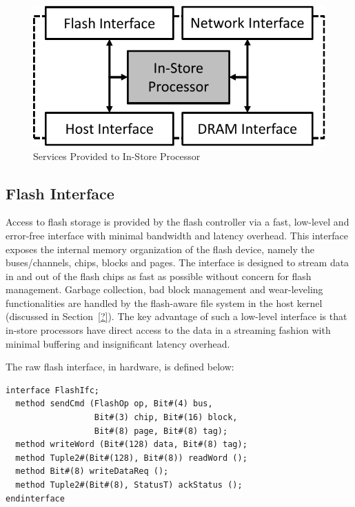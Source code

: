 \begin{figure}[h]
	\begin{center}
	\includegraphics[width=0.3\paperwidth]{figures/isp-service-crop.pdf}
	\caption{Services Provided to In-Store Processor}
	\label{fig:ispcore}
	\end{center}
\end{figure}

\subsection{Flash Interface}

Access to flash storage is provided by the flash controller via a
fast, low-level and error-free interface with minimal bandwidth and
latency overhead. This interface exposes the internal memory organization of
the flash device, namely the buses/channels, chips, blocks and pages.
The interface is designed to stream data in
and out of the flash chips as fast as possible without concern for
flash management. Garbage collection, bad block management and
wear-leveling functionalities are handled by the flash-aware file system
in the host kernel (discussed in Section~\ref{?}). The key advantage of such
a low-level interface is that in-store processors have direct access to
the data in a streaming fashion with minimal buffering and insignificant
latency overhead. 

The raw flash interface, in hardware, is defined below:

\begin{lstlisting}
interface FlashIfc;       
  method sendCmd (FlashOp op, Bit#(4) bus,
                  Bit#(3) chip, Bit#(16) block, 
                  Bit#(8) page, Bit#(8) tag);        
  method writeWord (Bit#(128) data, Bit#(8) tag);
  method Tuple2#(Bit#(128), Bit#(8)) readWord (); 
  method Bit#(8) writeDataReq ();
  method Tuple2#(Bit#(8), StatusT) ackStatus ();
endinterface 
\end{lstlisting}

